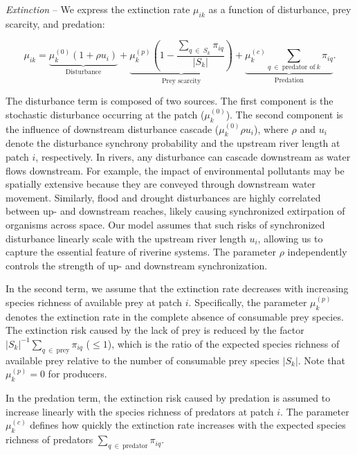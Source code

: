 \documentclass[11pt, class=article, crop=false]{standalone}
\begin{document}
\textit{Extinction} -- 
We express the extinction rate $\mu_{ik}$ as a function of disturbance, prey scarcity, and predation:

\begin{equation}
    \mu_{ik} = 
        \underbrace{\mu_{k}^{(0)} (1 + \rho u_i)}_{\text{Disturbance}} + 
        \underbrace{\mu_{k}^{(p)} \left(1 - \frac{\sum_{q~\in~S_k} \pi_{iq}}{|S_{k}|} \right)}_{\text{Prey scarcity}} + 
        \underbrace{\mu_{k}^{(c)} \sum_{q~\in~\text{predator of}~k} \pi_{iq}}_{\text{Predation}}.
    \label{eq:extn}
\end{equation}

The disturbance term is composed of two sources.
The first component is the stochastic disturbance occurring at the patch ($\mu_{k}^{(0)}$).
The second component is the influence of downstream disturbance cascade ($\mu_{k}^{(0)} \rho u_i$), where $\rho$ and $u_i$ denote the disturbance synchrony probability and the upstream river length at patch $i$, respectively.
In rivers, any disturbance can cascade downstream as water flows downstream.
For example, the impact of environmental pollutants may be spatially extensive because they are conveyed through downstream water movement.
Similarly, flood and drought disturbances are highly correlated between up- and downstream reaches, likely causing synchronized extirpation of organisms across space.
Our model assumes that such risks of synchronized disturbance linearly scale with the upstream river length $u_i$, allowing us to capture the essential feature of riverine systems.
The parameter $\rho$ independently controls the strength of up- and downstream synchronization.

In the second term, we assume that the extinction rate decreases with increasing species richness of available prey at patch $i$.
Specifically, the parameter $\mu_{k}^{(p)}$ denotes the extinction rate in the complete absence of consumable prey species.
The extinction risk caused by the lack of prey is reduced by the factor $|S_{k}|^{-1} \sum_{q~\in~\text{prey}} \pi_{iq}$ ($\le 1$), which is the ratio of the expected species richness of available prey relative to the number of consumable prey species $|S_{k}|$.
Note that $\mu_{k}^{(p)} = 0$ for producers.

In the predation term, the extinction risk caused by predation is assumed to increase linearly with the species richness of predators at patch $i$.
The parameter $\mu_{k}^{(c)}$ defines how quickly the extinction rate increases with the expected species richness of predators $\sum_{q~\in~\text{predator}} \pi_{iq}$.
\end{document}
